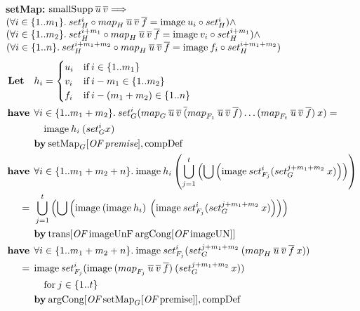 \textbf{setMap:} $\text{smallSupp} \: \overline{u} \: \overline{v} \Longrightarrow$ \\
\hspace*{1.7em} $(\forall i \in \{1..m_1\}. \: set_H^i \circ {map}_{H} \: \overline{u} \: \overline{v} \: \overline{f} = \text{image} \: u_i \circ set_H^i) \wedge$ \\
\hspace*{1.7em} $(\forall i \in \{1..m_2\}. \: set_H^{i+m_1} \circ {map}_{H} \: \overline{u} \: \overline{v} \: \overline{f} = \text{image} \: v_i \circ set_H^{i+m_1}) \wedge$ \\
\hspace*{1.7em} $(\forall i \in \{1..n\}. \: set_H^{i+m_1+m_2} \circ {map}_{H} \: \overline{u} \: \overline{v} \: \overline{f} = \text{image} \: f_i \circ set_H^{i+m_1+m_2})$
\begin{align}
\textbf{Let} \quad & h_i = \begin{cases}
u_i & \text{if} \: i \in \{1..m_1\} \\
v_i & \text{if} \: i - m_1 \in \{1..m_2\} \\
f_i & \text{if} \: i - (m_1+m_2) \in \{1..n\}
\end{cases} \nonumber \\
\have & \forall i \in \{1..m_1+m_2\}. \: set_G^i (\map{G}{u}{v}(\map{F_1}{u}{v}{f})\dots(\map{F_t}{u}{v}{f}) \: x) = \nonumber \\*
 & \quad \text{image} \: h_i \: (set_G^i x) \label{set_map1} \\*
 & \by \OF{\text{setMap}_G}{\textit{premise}}, \text{compDef} \nonumber \\
%
\have & \forall i \in \{1..m_1+m_2+n\}. \: \text{image} \: h_i \left( \bigcup_{j=1}^t \left(\bigcup \left( \text{image} \: set_{F_j}^i (set_G^{j+m_1+m_2} \: x) \right) \right) \right) \nonumber \\*
=\:\: & \bigcup_{j=1}^t \left( \bigcup \left( \text{image} \: (\text{image} \: h_i) \: \left( \text{image} \: set_{F_j}^i (set_G^{j+m_1+m_2} \: x) \right) \right) \right) \label{set_map2} \\*
 & \by \OF{\text{trans}}{\text{imageUnF} \: \OF{\text{argCong}}{\text{imageUN}}} \nonumber \\
%
\have & \forall i \in \{1..m_1+m_2+n\}. \: \text{image} \: set_{F_j}^i (set_G^{j+m_1+m_2} \: (\map{H}{u}{v}{f} \: x)) \nonumber \\*
=\:\: & \text{image} \: set_{F_j}^i (\text{image} \: (\map{F_j}{u}{v}{f}) \: (set_G^{j+m_1+m_2} \: x)) \label{set_map6} \\*
 & \quad \text{for} \: j \in \{1..t\} \nonumber \\*
 & \by \OF{\text{argCong}}{\OF{\text{setMap}_G}{\text{premise}}}, \text{compDef} \nonumber \\

\end{align}
